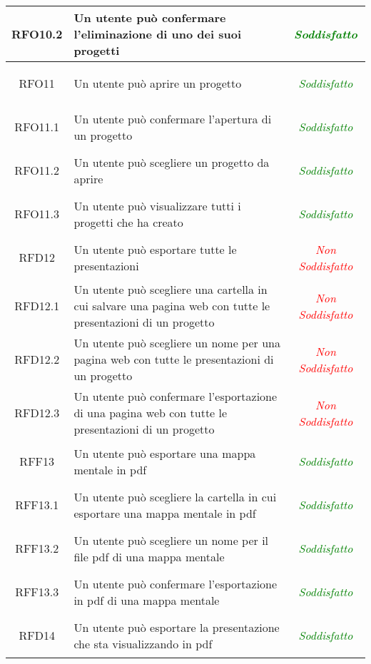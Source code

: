 \begin{longtable}{|c|>{\centering}m{7cm}|c|}
\hypertarget{RFO10.2}{RFO10.2} & Un utente può confermare l’eliminazione di uno dei suoi progetti & \textcolor{Green}{\textit{Soddisfatto}}\\ \hline
\hypertarget{RFO11}{RFO11} & Un utente può aprire un progetto & \textcolor{Green}{\textit{Soddisfatto}}\\ \hline
\hypertarget{RFO11.1}{RFO11.1} & Un utente può confermare l'apertura di un progetto & \textcolor{Green}{\textit{Soddisfatto}}\\ \hline
\hypertarget{RFO11.2}{RFO11.2} & Un utente può scegliere un progetto da aprire & \textcolor{Green}{\textit{Soddisfatto}}\\ \hline
\hypertarget{RFO11.3}{RFO11.3} & Un utente può visualizzare tutti i progetti che ha creato & \textcolor{Green}{\textit{Soddisfatto}}\\ \hline
\hypertarget{RFD12}{RFD12} & Un utente può esportare tutte le presentazioni & \textcolor{Red}{\textit{Non Soddisfatto}}\\ \hline
\hypertarget{RFD12.1}{RFD12.1} & Un utente può scegliere una cartella in cui salvare una pagina web con tutte le presentazioni di un progetto & \textcolor{Red}{\textit{Non Soddisfatto}}\\ \hline
\hypertarget{RFD12.2}{RFD12.2} & Un utente può scegliere un nome per una pagina web con tutte le presentazioni di un progetto & \textcolor{Red}{\textit{Non Soddisfatto}}\\ \hline
\hypertarget{RFD12.3}{RFD12.3} & Un utente può confermare l'esportazione di una pagina web con tutte le presentazioni di un progetto & \textcolor{Red}{\textit{Non Soddisfatto}}\\ \hline
\hypertarget{RFF13}{RFF13} & Un utente può esportare una mappa mentale in pdf & \textcolor{Green}{\textit{Soddisfatto}}\\ \hline
\hypertarget{RFF13.1}{RFF13.1} & Un utente può scegliere la cartella in cui esportare una mappa mentale in pdf & \textcolor{Green}{\textit{Soddisfatto}}\\ \hline
\hypertarget{RFF13.2}{RFF13.2} & Un utente può scegliere un nome per il file pdf di una mappa mentale & \textcolor{Green}{\textit{Soddisfatto}}\\ \hline
\hypertarget{RFF13.3}{RFF13.3} & Un utente può confermare l'esportazione in pdf di una mappa mentale & \textcolor{Green}{\textit{Soddisfatto}}\\ \hline
\hypertarget{RFD14}{RFD14} & Un utente può esportare la presentazione che sta visualizzando in pdf & \textcolor{Green}{\textit{Soddisfatto}}\\ \hline

\end{longtable}
